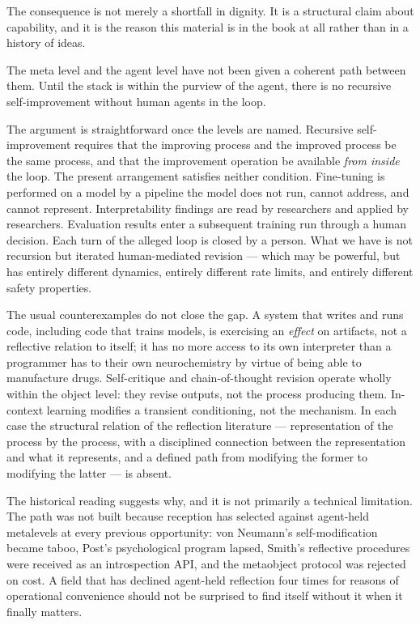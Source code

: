 The consequence is not merely a shortfall in dignity.
It is a structural claim about capability, and it is the reason this
material is in the book at all rather than in a history of ideas.

\begin{principle}
\label{psy:prin:loop}
The meta level and the agent level have not been given a coherent
path between them.
Until the stack is within the purview of the agent, there is no
recursive self-improvement without human agents in the loop.
\end{principle}

The argument is straightforward once the levels are named.
Recursive self-improvement requires that the improving process and
the improved process be the same process, and that the improvement
operation be available \emph{from inside} the loop.
The present arrangement satisfies neither condition.
Fine-tuning is performed on a model by a pipeline the model does not
run, cannot address, and cannot represent.
Interpretability findings are read by researchers and applied by
researchers.
Evaluation results enter a subsequent training run through a human
decision.
Each turn of the alleged loop is closed by a person.
What we have is not recursion but iterated human-mediated revision
--- which may be powerful, but has entirely different dynamics,
entirely different rate limits, and entirely different safety
properties.

The usual counterexamples do not close the gap.
A system that writes and runs code, including code that trains
models, is exercising an \emph{effect} on artifacts, not a
reflective relation to itself; it has no more access to its own
interpreter than a programmer has to their own neurochemistry by
virtue of being able to manufacture drugs.
Self-critique and chain-of-thought revision operate wholly within
the object level: they revise outputs, not the process producing
them.
In-context learning modifies a transient conditioning, not the
mechanism.
In each case the structural relation of the reflection literature
--- representation of the process by the process, with a disciplined
connection between the representation and what it represents, and a
defined path from modifying the former to modifying the latter ---
is absent.

The historical reading suggests why, and it is not primarily a
technical limitation.
The path was not built because reception has selected against
agent-held metalevels at every previous opportunity: von Neumann's
self-modification became taboo, Post's psychological program lapsed,
Smith's reflective procedures were received as an introspection API,
and the metaobject protocol was rejected on cost.
A field that has declined agent-held reflection four times for
reasons of operational convenience should not be surprised to find
itself without it when it finally matters.

